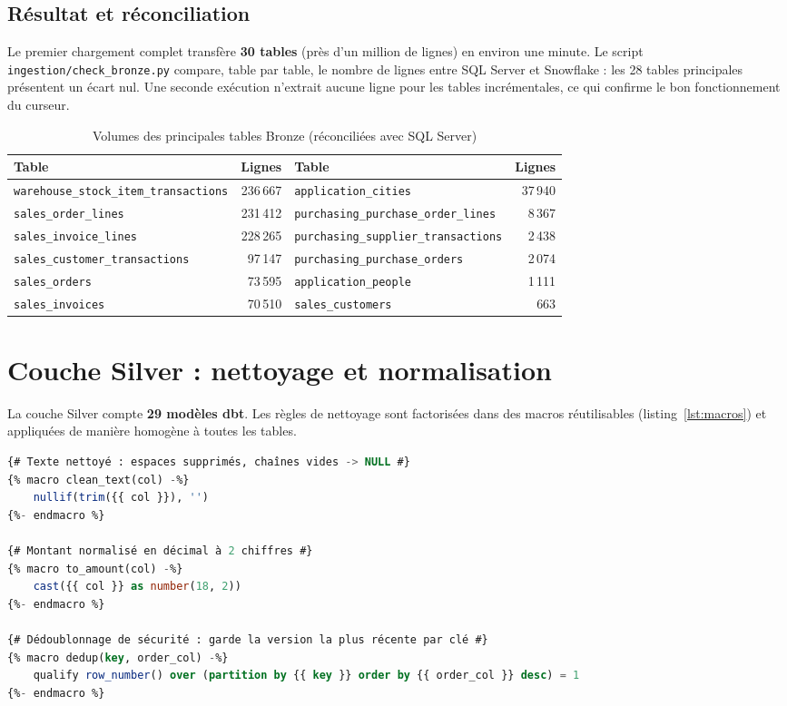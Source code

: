 \subsection{Résultat et réconciliation}
Le premier chargement complet transfère \textbf{30 tables} (près d'un million de lignes) en
environ une minute. Le script \texttt{ingestion/check\_bronze.py} compare, table par table, le nombre de lignes
entre SQL Server et Snowflake : les 28 tables principales présentent un écart nul. Une seconde exécution
n'extrait aucune ligne pour les tables incrémentales, ce qui confirme le bon fonctionnement du curseur.

\begin{table}[H]
\centering
\caption{Volumes des principales tables Bronze (réconciliées avec SQL Server)}
\label{tab:bronze}
\small
\begin{tabular}{@{}l r l r@{}}
\toprule
\textbf{Table} & \textbf{Lignes} & \textbf{Table} & \textbf{Lignes} \\
\midrule
\texttt{warehouse\_stock\_item\_transactions} & 236\,667 & \texttt{application\_cities} & 37\,940 \\
\texttt{sales\_order\_lines} & 231\,412 & \texttt{purchasing\_purchase\_order\_lines} & 8\,367 \\
\texttt{sales\_invoice\_lines} & 228\,265 & \texttt{purchasing\_supplier\_transactions} & 2\,438 \\
\texttt{sales\_customer\_transactions} & 97\,147 & \texttt{purchasing\_purchase\_orders} & 2\,074 \\
\texttt{sales\_orders} & 73\,595 & \texttt{application\_people} & 1\,111 \\
\texttt{sales\_invoices} & 70\,510 & \texttt{sales\_customers} & 663 \\
\bottomrule
\end{tabular}
\end{table}

\section{Couche Silver : nettoyage et normalisation}
\label{sec:silver}

La couche Silver compte \textbf{29 modèles dbt}. Les règles de nettoyage sont factorisées dans des
macros réutilisables (listing~\ref{lst:macros}) et appliquées de manière homogène à toutes les tables.

\begin{lstlisting}[language=SQL, caption={Macros de nettoyage (\texttt{macros/cleaning.sql}, extrait)}, label=lst:macros]
{# Texte nettoyé : espaces supprimés, chaînes vides -> NULL #}
{% macro clean_text(col) -%}
    nullif(trim({{ col }}), '')
{%- endmacro %}

{# Montant normalisé en décimal à 2 chiffres #}
{% macro to_amount(col) -%}
    cast({{ col }} as number(18, 2))
{%- endmacro %}

{# Dédoublonnage de sécurité : garde la version la plus récente par clé #}
{% macro dedup(key, order_col) -%}
    qualify row_number() over (partition by {{ key }} order by {{ order_col }} desc) = 1
{%- endmacro %}
\end{lstlisting}

